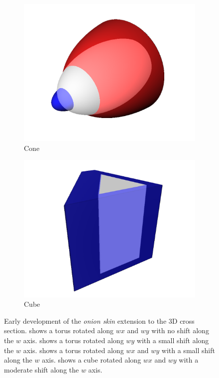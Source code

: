 \documentclass{l4proj}
\begin{document}
\begin{figure}[H]
\begin{subfigure}[b]{0.24\textwidth}
    \includegraphics[width=\textwidth]{images/representations/onion-cone.png}
    \caption{Cone}
    \label{fig:rep_onion-cone}
  \end{subfigure}
  \begin{subfigure}[b]{0.24\textwidth}
    \includegraphics[width=\textwidth]{images/representations/onion-cube-2.png}
    \caption{Cube}
    \label{fig:rep_onion-cube}
  \end{subfigure}
  \caption{
    Early development of the \emph{onion skin} extension to the 3D cross section.
     shows a torus rotated along $wx$ and $wy$ with no shift along the $w$ axis.
     shows a torus rotated along $wy$ with a small shift along the $w$ axis.
     shows a torus rotated along $wx$ and $wy$ with a small shift along the $w$ axis.
     shows a cube rotated along $wx$ and $wy$ with a moderate shift along the $w$ axis.
    }
  \label{fig:rep_onion}
\end{figure}
\end{document}
